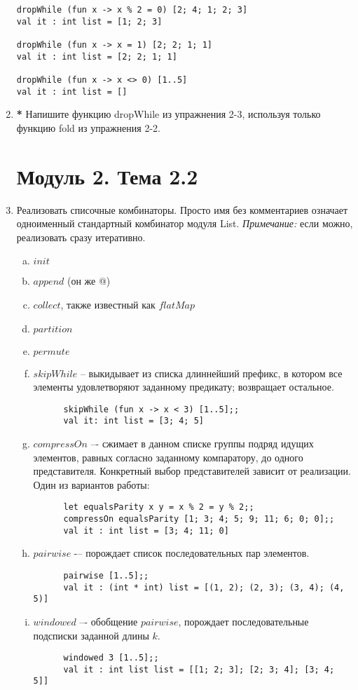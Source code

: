 \documentclass[a4paper,11pt]{article}
\begin{document}
\begin{enumerate}[{2-}1]
\begin{lstlisting}
dropWhile (fun x -> x % 2 = 0) [2; 4; 1; 2; 3]
val it : int list = [1; 2; 3]

dropWhile (fun x -> x = 1) [2; 2; 1; 1]
val it : int list = [2; 2; 1; 1]

dropWhile (fun x -> x <> 0) [1..5]
val it : int list = []
\end{lstlisting}

\item \textbf{*} Напишите функцию dropWhile из упражнения 2-3, используя только
функцию fold из упражнения 2-2.

\section*{Модуль 2. Тема 2.2}

\item Реализовать списочные комбинаторы. Просто имя без комментариев означает 
  одноименный стандартный комбинатор модуля List.
  \emph{Примечание:} если можно, реализовать сразу итеративно.
  \begin{enumerate}[(a)]
  \item $init$
  \item $append$ (он же @)
  \item $collect$, также известный как $flatMap$
  \item $partition$
  \item $permute$
  \item $skipWhile$ -- выкидывает из списка длиннейший префикс, в котором все 
    элементы удовлетворяют заданному предикату; возвращает остальное.
    \begin{lstlisting}
      skipWhile (fun x -> x < 3) [1..5];;
      val it: int list = [3; 4; 5]
    \end{lstlisting}
  \item $compressOn$ –- сжимает в данном списке группы подряд идущих элементов,
    равных согласно заданному компаратору, до одного представителя. Конкретный 
    выбор представителей зависит от реализации. Один из вариантов работы:
    \begin{lstlisting}
      let equalsParity x y = x % 2 = y % 2;;
      compressOn equalsParity [1; 3; 4; 5; 9; 11; 6; 0; 0];;
      val it : int list = [3; 4; 11; 0]
    \end{lstlisting}
  \item $pairwise$ -– порождает список последовательных пар элементов.
    \begin{lstlisting}
      pairwise [1..5];;
      val it : (int * int) list = [(1, 2); (2, 3); (3, 4); (4, 5)]
    \end{lstlisting}
  \item $windowed$ –- обобщение $pairwise$, порождает последовательные подсписки 
    заданной длины $k$.
    \begin{lstlisting}
      windowed 3 [1..5];;
      val it : int list list = [[1; 2; 3]; [2; 3; 4]; [3; 4; 5]]
    \end{lstlisting}
  \end{enumerate}


\end{enumerate}
\end{document}
